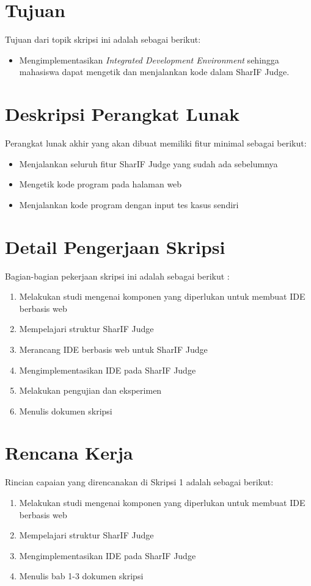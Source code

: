 \documentclass[a4paper,twoside]{article}
\begin{document}
\section{Tujuan}
Tujuan dari topik skripsi ini adalah sebagai berikut:
\begin{itemize}
	\item Mengimplementasikan {\it Integrated Development Environment} sehingga mahasiswa dapat mengetik dan menjalankan kode dalam SharIF Judge.
\end{itemize}

\section{Deskripsi Perangkat Lunak}
Perangkat lunak akhir yang akan dibuat memiliki fitur minimal sebagai berikut:
\begin{itemize}
	\item Menjalankan seluruh fitur SharIF Judge yang sudah ada sebelumnya
	\item Mengetik kode program pada halaman web
	\item Menjalankan kode program dengan input tes kasus sendiri
\end{itemize}

\section{Detail Pengerjaan Skripsi}
Bagian-bagian pekerjaan skripsi ini adalah sebagai berikut :
\begin{enumerate}
	\item Melakukan studi mengenai komponen yang diperlukan untuk membuat IDE berbasis web
	\item Mempelajari struktur SharIF Judge
	\item Merancang IDE berbasis web untuk SharIF Judge
	\item Mengimplementasikan IDE pada SharIF Judge
	\item Melakukan pengujian dan eksperimen
	\item Menulis dokumen skripsi
\end{enumerate}

\section{Rencana Kerja}
Rincian capaian yang direncanakan di Skripsi 1 adalah sebagai berikut:
\begin{enumerate}
	\item Melakukan studi mengenai komponen yang diperlukan untuk membuat IDE berbasis web
	\item Mempelajari struktur SharIF Judge
	\item Mengimplementasikan IDE pada SharIF Judge
	\item Menulis bab 1-3 dokumen skripsi
\end{enumerate}
\end{document}
